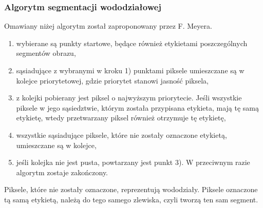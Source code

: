 \subsubsection{Algorytm segmentacji wododziałowej}
Omawiany niżej algorytm został zaproponowany przez F. Meyera.
\begin{enumerate}
  \item wybierane są punkty startowe, będące również etykietami poszczególnych segmentów obrazu,
  \item sąsiadujące z wybranymi w kroku 1) punktami piksele umieszczane są w kolejce priorytetowej, gdzie priorytet stanowi jasność piksela,
  \item z kolejki pobierany jest piksel o najwyższym priorytecie. Jeśli wszystkie piksele w jego sąsiedztwie, którym została przypisana etykieta, mają tę samą etykietę, wtedy przetwarzany piksel również otrzymuje tę etykietę,
  \item wszystkie sąsiadujące piksele, które nie zostały oznaczone etykietą, umieszczane są w kolejce,
  \item jeśli kolejka nie jest pusta, powtarzany jest punkt 3). W przeciwnym razie algorytm zostaje zakończony.
\end{enumerate}
Piksele, które nie zostały oznaczone, reprezentują wododziały. Piksele oznaczone tą samą etykietą, należą do tego samego zlewiska, czyli tworzą ten sam segment.

